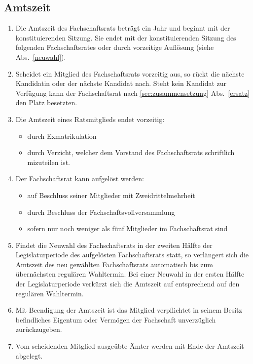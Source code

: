 \subsection{Amtszeit}
\begin{enumerate}
\item Die Amtszeit des Fachschaftsrats beträgt ein Jahr und beginnt mit der konstituierenden Sitzung. Sie endet mit der konstituierenden Sitzung des folgenden Fachschaftsrates oder durch vorzeitige Auflösung (siehe Abs.~\ref{neuwahl}).
\item Scheidet ein Mitglied des Fachschaftsrats vorzeitig aus, so rückt die nächste Kandidatin  oder der nächste Kandidat nach. Steht kein Kandidat zur Verfügung kann der Fachschaftsrat nach \ref{sec:zusammensetzung} Abs.~\ref{ersatz} den Platz besetzten.
\item Die Amtszeit eines Ratsmitglieds endet vorzeitig:
\begin{itemize}
\item durch Exmatrikulation
\item durch Verzicht, welcher dem Vorstand des Fachschaftsrats schriftlich mizuteilen ist.
\end{itemize}
\item Der Fachschaftsrat kann aufgelöst werden:
\begin{itemize}
\item auf Beschluss seiner Mitglieder mit Zweidrittelmehrheit
\item durch Beschluss der Fachschaftsvollversammlung
\item sofern nur noch weniger als fünf Mitglieder im Fachschaftsrat sind
\end{itemize}
\item \label{neuwahl} Findet die Neuwahl des Fachschaftsrats in der zweiten Hälfte der Legislaturperiode des aufgelösten Fachschaftsrats statt, so verlängert sich die Amtszeit des neu gewählten Fachschaftsrats automatisch bis zum übernächsten regulären Wahltermin. Bei einer Neuwahl in der ersten Hälfte der Legislaturperiode verkürzt sich die Amtszeit auf entsprechend auf den regulären Wahltermin.
\item Mit Beendigung der Amtszeit ist das Mitglied verpflichtet in seinem Besitz befindliches Eigentum oder Vermögen der Fachschaft unverzüglich zurückzugeben.
\item Vom scheidenden Mitglied ausgeübte Ämter werden mit Ende der Amtszeit abgelegt.
\end{enumerate}

